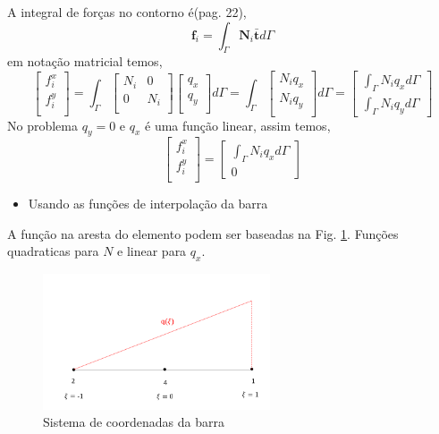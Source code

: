 A integral de forças no contorno é(pag. 22),
%
\begin{equation}
	\mathbf{f}_i = \int_{\Gamma} \mathbf{N}_i \mathbf{\bar t} d\Gamma
\end{equation}
%
em notação matricial temos,
%
\begin{equation}
	\begin{bmatrix}
		f^x_i\\
		f^y_i\\
	\end{bmatrix}
	=
	\int_{\Gamma}
	\begin{bmatrix}
		N_i&0\\
		0&N_i\\
	\end{bmatrix}
	\begin{bmatrix}
		q_x\\
		q_y\\
	\end{bmatrix}
	d\Gamma
	=
	\int_{\Gamma}
	\begin{bmatrix}
		N_i q_x\\
		N_i q_y\\
	\end{bmatrix}
	d\Gamma
	=
	\begin{bmatrix}
		\int_{\Gamma} N_i q_x d\Gamma\\
		\int_{\Gamma} N_i q_y d\Gamma
	\end{bmatrix}
\end{equation}
%
No problema $q_y = 0$ e $q_x$ é uma função linear, assim temos,
%
\begin{equation}
	\begin{bmatrix}
		f^x_i\\
		f^y_i\\
	\end{bmatrix}
	=
	\begin{bmatrix}
		\int_{\Gamma} N_i q_x d\Gamma\\
		0
	\end{bmatrix}
\end{equation}
%
\begin{itemize}
	\item Usando as funções de interpolação da barra
\end{itemize}
%
A função na aresta do elemento podem ser baseadas na Fig. \ref{provas:Lado do triangulo}. Funções quadraticas para $N$ e linear para $q_x$.
%
\begin{figure}[H]
	\includegraphics[width=0.6\textwidth,center]{fig/q1_prova_2012.PNG}
	\caption{Sistema de coordenadas da barra} 
	\label{provas:Lado do triangulo}
\end{figure}
